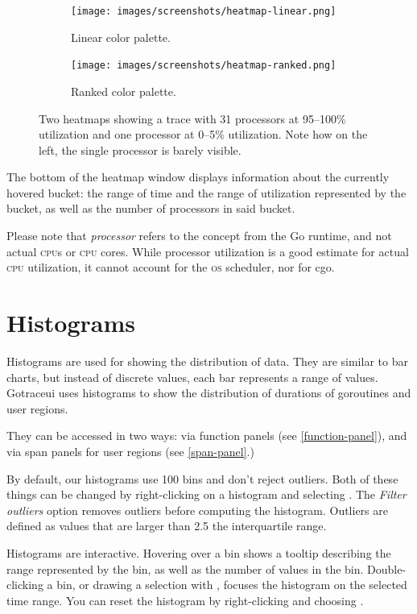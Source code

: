 \documentclass[10pt,letterpaper,oneside,openany,english]{memoir}
\newcommand{\shortcut}{\ctrl{} or \cmdmac}
\begin{document}
\begin{figure}[h]
  \centering
  \begin{subfigure}[b]{0.49\textwidth}
    \centering
    \texttt{[image: images/screenshots/heatmap-linear.png]}
    \caption{Linear color palette.}
  \end{subfigure}
  \hfill
  \begin{subfigure}[b]{0.49\textwidth}
    \centering
    \texttt{[image: images/screenshots/heatmap-ranked.png]}
    \caption{Ranked color palette.}
  \end{subfigure}

  \caption{Two heatmaps showing a trace with 31 processors at 95--100\% utilization and one processor at 0--5\% utilization. Note how on the left, the single processor is barely visible.}
\end{figure}

The bottom of the heatmap window displays information about the currently hovered bucket:
the range of time and the range of utilization represented by the bucket, as well as the number of processors in said bucket.

Please note that \emph{processor} refers to the concept from the Go runtime, and not actual \textsc{cpu}s or \textsc{cpu} cores.
While processor utilization is a good estimate for actual \textsc{cpu} utilization, it cannot account for the \textsc{os} scheduler, nor for cgo.

\section{Histograms}\label{histograms}

Histograms are used for showing the distribution of data.
They are similar to bar charts, but instead of discrete values, each bar represents a range of values.
Gotraceui uses histograms to show the distribution of durations of goroutines and user regions.

They can be accessed in two ways: via function panels (see \cref{function-panel}),
and via span panels for user regions (see \cref{span-panel}.)

By default, our histograms use 100 bins and don't reject outliers.
Both of these things can be changed by right-clicking on a histogram and selecting .
The \emph{Filter outliers} option removes outliers before computing the histogram.
Outliers are defined as values that are larger than 2.5\times{} the interquartile range.

Histograms are interactive.
Hovering over a bin shows a tooltip describing the range represented by the bin, as well as the number of values in the bin.
Double-clicking a bin, or drawing a selection with \keys{\shortcut + LMB}, focuses the histogram on the selected time range.
You can reset the histogram by right-clicking and choosing .
\end{document}
